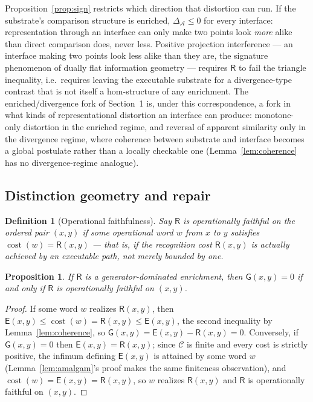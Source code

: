 \documentclass[11pt]{article}
\newtheorem{proposition}[theorem]{Proposition}
\newtheorem{definition}[theorem]{Definition}
\theoremstyle{remark}
\newcommand{\C}{\mathcal{C}}
\newcommand{\A}{\mathcal{A}}
\newcommand{\R}{\mathsf{R}}
\newcommand{\E}{\mathsf{E}}
\newcommand{\G}{\mathsf{G}}
\begin{document}
Proposition~\ref{prop:sign} restricts which direction that distortion
can run. If the substrate's comparison structure is enriched,
$\Delta_{\A}\le0$ for every interface: representation through an
interface can only make two points look \emph{more} alike than direct
comparison does, never less. Positive projection interference — an
interface making two points look less alike than they are, the
signature phenomenon of dually flat information geometry — requires
$\R$ to fail the triangle inequality, i.e.\ requires leaving the
executable substrate for a divergence-type contrast that is not
itself a hom-structure of any enrichment. The enriched/divergence
fork of Section~1 is, under this correspondence, a fork in what kinds
of representational distortion an interface can produce: monotone-only
distortion in the enriched regime, and reversal of apparent similarity
only in the divergence regime, where coherence between substrate and
interface becomes a global postulate rather than a locally checkable
one (Lemma~\ref{lem:coherence} has no divergence-regime analogue).

\subsection{Distinction geometry and repair}\label{subsec:distinction}

\begin{definition}[Operational faithfulness]\label{def:faithful}
Say $\R$ is \emph{operationally faithful} on the ordered pair $(x,y)$
if some operational word $w$ from $x$ to $y$ satisfies
$\operatorname{cost}(w)=\R(x,y)$ --- that is, if the recognition cost
$\R(x,y)$ is actually achieved by an executable path, not merely
bounded by one.
\end{definition}

\begin{proposition}\label{prop:faithful}
If $\R$ is a generator-dominated enrichment, then $\G(x,y)=0$ if and
only if $\R$ is operationally faithful on $(x,y)$.
\end{proposition}

\begin{proof}
If some word $w$ realizes $\R(x,y)$, then
$\E(x,y)\le\operatorname{cost}(w)=\R(x,y)\le\E(x,y)$, the second
inequality by Lemma~\ref{lem:coherence}, so
$\G(x,y)=\E(x,y)-\R(x,y)=0$. Conversely, if $\G(x,y)=0$ then
$\E(x,y)=\R(x,y)$; since $\C$ is finite and every cost is strictly
positive, the infimum defining $\E(x,y)$ is attained by some word
$w$ (Lemma~\ref{lem:amalgam}'s proof makes the same finiteness
observation), and $\operatorname{cost}(w)=\E(x,y)=\R(x,y)$, so $w$
realizes $\R(x,y)$ and $\R$ is operationally faithful on $(x,y)$.
\end{proof}
\end{document}
